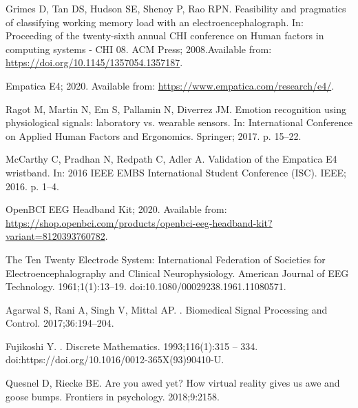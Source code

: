 \documentclass[10pt,letterpaper]{article}
\begin{document}
\begin{thebibliography}{10}
  Grimes D, Tan DS, Hudson SE, Shenoy P, Rao RPN.
  \newblock Feasibility and pragmatics of classifying working memory load with an
    electroencephalograph.
  \newblock In: Proceeding of the twenty-sixth annual {CHI} conference on Human
    factors in computing systems - {CHI} {\textquotesingle}08. {ACM} Press;
    2008.Available from: \url{https://doi.org/10.1145/1357054.1357187}.
  
  {Empatica E4}; 2020.
  \newblock Available from: \url{https://www.empatica.com/research/e4/}.
  
  Ragot M, Martin N, Em S, Pallamin N, Diverrez JM.
  \newblock Emotion recognition using physiological signals: laboratory vs.
    wearable sensors.
  \newblock In: International Conference on Applied Human Factors and Ergonomics.
    Springer; 2017. p. 15--22.
  
  McCarthy C, Pradhan N, Redpath C, Adler A.
  \newblock Validation of the {Empatica E4} wristband.
  \newblock In: 2016 IEEE EMBS International Student Conference (ISC). IEEE;
    2016. p. 1--4.
  
  {OpenBCI EEG Headband Kit}; 2020.
  \newblock Available from:
    \url{https://shop.openbci.com/products/openbci-eeg-headband-kit?variant=8120393760782}.
  
  The Ten Twenty Electrode System: International Federation of Societies for
    Electroencephalography and Clinical Neurophysiology.
  \newblock American Journal of EEG Technology. 1961;1(1):13--19.
  \newblock doi:{10.1080/00029238.1961.11080571}.
  
  Agarwal S, Rani A, Singh V, Mittal AP.
  .
  \newblock Biomedical Signal Processing and Control. 2017;36:194--204.
  
  Fujikoshi Y.
  .
  \newblock Discrete Mathematics. 1993;116(1):315 -- 334.
  \newblock doi:{https://doi.org/10.1016/0012-365X(93)90410-U}.
  
  Quesnel D, Riecke BE.
  \newblock Are you awed yet? How virtual reality gives us awe and goose bumps.
  \newblock Frontiers in psychology. 2018;9:2158.
  
  \end{thebibliography}
\end{document}
